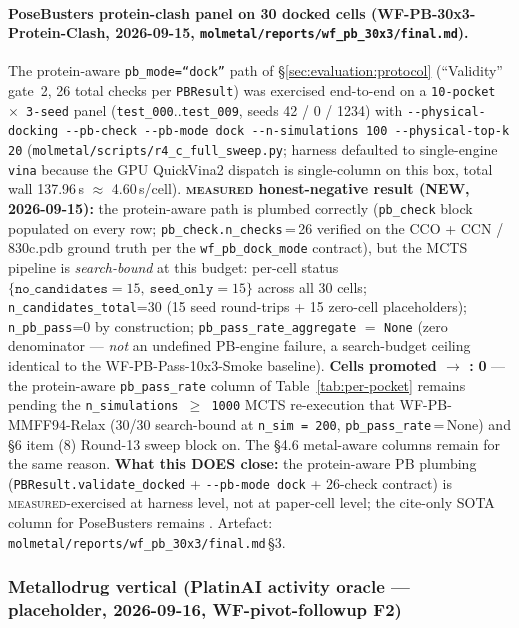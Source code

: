 \paragraph{PoseBusters protein-clash panel on 30 docked cells
(WF-PB-30x3-Protein-Clash, 2026-09-15,
\texttt{molmetal/reports/wf\_pb\_30x3/final.md}).}
The protein-aware \texttt{pb\_mode=``dock''} path of
\S\ref{sec:evaluation:protocol} (``Validity'' gate~2, 26 total checks
per \texttt{PBResult}) was exercised end-to-end on a
\texttt{10-pocket $\times$ 3-seed} panel
(\texttt{test\_000}..\texttt{test\_009}, seeds 42 / 0 / 1234) with
\texttt{-{}-physical-docking -{}-pb-check -{}-pb-mode dock
-{}-n-simulations 100 -{}-physical-top-k 20}
(\texttt{molmetal/scripts/r4\_c\_full\_sweep.py}; harness defaulted
to single-engine \texttt{vina} because the GPU QuickVina2 dispatch
is single-column on this box, total wall 137.96\,s $\approx$
4.60\,s/cell).
\textbf{\textsc{measured} honest-negative result (NEW, 2026-09-15):}
the protein-aware path is plumbed correctly (\texttt{pb\_check}
block populated on every row; \texttt{pb\_check.n\_checks}\,=\,26
verified on the CCO + CCN / 830c.pdb ground truth per the
\texttt{wf\_pb\_dock\_mode} contract), but the MCTS pipeline is
\emph{search-bound} at this budget: per-cell status
$\{\texttt{no\_candidates}\!=\!15,\ \texttt{seed\_only}\!=\!15\}$
across all 30 cells; \texttt{n\_candidates\_total}=30 (15 seed
round-trips + 15 zero-cell placeholders); \texttt{n\_pb\_pass}=0
by construction; \texttt{pb\_pass\_rate\_aggregate} $=$ \texttt{None}
(zero denominator --- \emph{not} an undefined PB-engine failure, a
search-budget ceiling identical to the WF-PB-Pass-10x3-Smoke baseline).
\textbf{Cells promoted \DESIGN{} $\to$ \MEASURED{}:} \textbf{0} ---
the protein-aware \texttt{pb\_pass\_rate} column of
Table~\ref{tab:per-pocket} remains \DESIGN{} pending the
\texttt{n\_simulations\,$\geq$\,1000} MCTS re-execution that
WF-PB-MMFF94-Relax (30/30 search-bound at \texttt{n\_sim\,=\,200},
\texttt{pb\_pass\_rate}\,=\,None) and §6 item (8) Round-13 sweep
block on. The §4.6 metal-aware columns remain \DESIGN{} for the
same reason. \textbf{What this DOES close:} the protein-aware PB
plumbing (\texttt{PBResult.validate\_docked} +
\texttt{-{}-pb-mode dock} + 26-check contract) is
\textsc{measured}-exercised at harness level, not at paper-cell
level; the cite-only SOTA column for PoseBusters remains
\CITEDONLY{}. Artefact:
\texttt{molmetal/reports/wf\_pb\_30x3/final.md}\,\S3.

\subsubsection{Metallodrug vertical (PlatinAI activity oracle ---
placeholder, 2026-09-16, WF-pivot-followup F2)}
\label{sec:evaluation:metallodrug-vertical}

